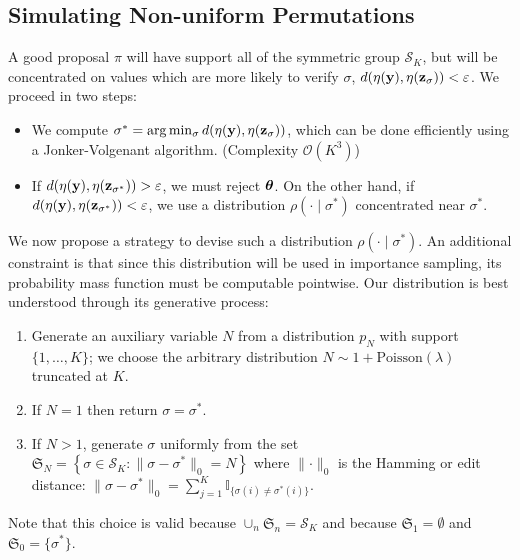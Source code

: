 \subsection{Simulating Non-uniform Permutations}
\label{secperm}

A good proposal $\pi$ will have support all of the symmetric group $\mathcal{S}_K$, but will be concentrated on values which are more likely to verify $\sigma$, $d(\eta(\mathbf{y}), \eta(\mathbf{z}_{\sigma})) < \varepsilon$. We proceed in two steps:

\begin{itemize}
    \item We compute $\sigma^* = \arg\min_{\sigma} d(\eta(\mathbf{y}), \eta(\mathbf{z}_{\sigma}))$, which can be done efficiently using a Jonker-Volgenant algorithm. (Complexity $\mathcal{O}(K^3)$)
    \item If $d(\eta(\mathbf{y}), \eta(\mathbf{z}_{\sigma^*})) > \varepsilon$, we must reject $\boldsymbol{\theta}$. On the other hand, if $d(\eta(\mathbf{y}), \eta(\mathbf{z}_{\sigma^*})) < \varepsilon$, we use a distribution $\rho(\cdot\mid\sigma^*)$ concentrated near $\sigma^*$.
\end{itemize}



We now propose a strategy to devise such a distribution $\rho(\cdot\mid\sigma^*)$. An additional constraint is that since this distribution will be used in importance sampling, its probability mass function must be computable pointwise. Our distribution is best understood through its generative process:

\begin{enumerate}
    \item Generate an auxiliary variable $N$ from a distribution $p_N$ with support $\{1, \ldots, K\}$; we choose the arbitrary distribution $N \sim 1 + \text{Poisson}(\lambda)$ truncated at $K$.
    \item If $N = 1$ then return $\sigma = \sigma^*$.
    \item If $N > 1$, generate $\sigma$ uniformly from the set $\mathfrak{S}_N = \left\{\sigma \in \mathcal{S}_K: \lVert \sigma - \sigma^*\rVert_0 = N\right\}$ where $\lVert \cdot \rVert_0$ is the Hamming or edit distance: $\lVert\sigma - \sigma^*\rVert_0 = \sum_{j=1}^K \mathbb{I}_{\{\sigma(i) \neq \sigma^*(i)\}}$.
\end{enumerate}

Note that this choice is valid because $\cup_n \mathfrak{S}_n = \mathcal{S}_K$ and because $\mathfrak{S}_1 = \emptyset$ and $\mathfrak{S}_0 = \{\sigma^*\}$. 

